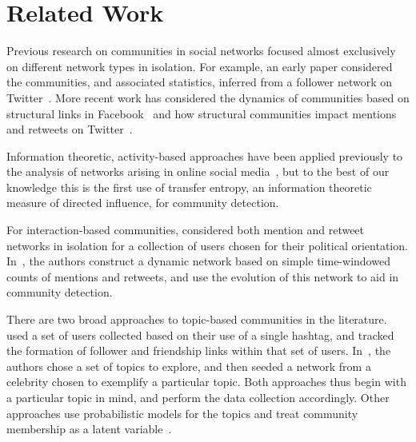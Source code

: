 \section{Related Work}

Previous research on communities in social networks focused almost exclusively on different network types in isolation. For example, an early paper considered the communities, and associated statistics, inferred from a follower network on Twitter~\cite{java2009we}. More recent work has considered the dynamics of communities based on structural links in Facebook~\cite{nguyen2011adaptive} and how structural communities impact mentions and retweets on Twitter~\cite{grabowicz2012social}.


Information theoretic, activity-based approaches have been applied previously to the analysis of networks arising in online social media~\cite{ver2012information,darmon2013detecting}, but to the best of our knowledge this is the first use of transfer entropy, an information theoretic measure of directed influence, for community detection.

For interaction-based communities, \cite{conover2011political} considered both mention and retweet networks in isolation for a collection of users chosen for their political orientation. In~\cite{deitrick2013mutually}, the authors construct a dynamic network based on simple time-windowed counts of mentions and retweets, and use the evolution of this network to aid in community detection.

There are two broad approaches to topic-based communities in the literature. \cite{rossi2012conversation} used a set of users collected based on their use of a single hashtag, and tracked the formation of follower and friendship links within that set of users. In~\cite{lim2012following}, the authors chose a set of topics to explore, and then seeded a network from a celebrity chosen to exemplify a particular topic. Both approaches thus begin with a particular topic in mind, and perform the data collection accordingly. Other approaches use probabilistic models for the topics and treat community membership as a latent variable~\cite{yin2012latent}.




